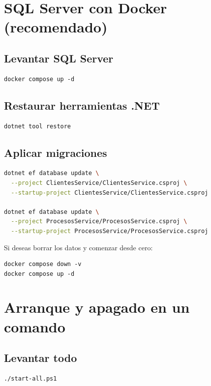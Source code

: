 \documentclass[12pt]{article}
\begin{document}
\section{SQL Server con Docker (recomendado)}

\subsection*{Levantar SQL Server}
\begin{verbatim}
docker compose up -d
\end{verbatim}

\subsection*{Restaurar herramientas .NET}
\begin{verbatim}
dotnet tool restore
\end{verbatim}

\subsection*{Aplicar migraciones}

\begin{lstlisting}[language=bash, caption={Ejecución de migraciones de base de datos}]
dotnet ef database update \
  --project ClientesService/ClientesService.csproj \
  --startup-project ClientesService/ClientesService.csproj

dotnet ef database update \
  --project ProcesosService/ProcesosService.csproj \
  --startup-project ProcesosService/ProcesosService.csproj
\end{lstlisting}

Si deseas borrar los datos y comenzar desde cero:

\begin{verbatim}
docker compose down -v
docker compose up -d
\end{verbatim}

\section{Arranque y apagado en un comando}

\subsection*{Levantar todo}
\begin{verbatim}
./start-all.ps1
\end{verbatim}
\end{document}
